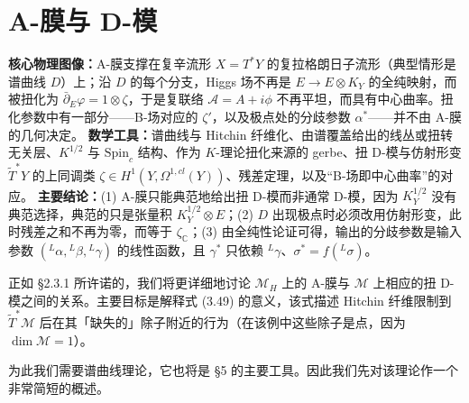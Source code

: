 

\section{A-膜与 D-模}

\begin{keytakeaway}
\textbf{核心物理图像：}A-膜支撑在复辛流形 $X=T^*Y$ 的复拉格朗日子流形（典型情形是谱曲线 $D$）上；沿 $D$ 的每个分支，Higgs 场不再是 $E\to E\otimes K_Y$ 的全纯映射，而被扭化为 $\bar\partial_E\varphi=1\otimes\zeta$，于是复联络 $\mathcal{A}=A+i\phi$ 不再平坦，而具有中心曲率。扭化参数中有一部分——B-场对应的 $\zeta'$，以及极点处的分歧参数 $\alpha^*$——并不由 A-膜的几何决定。
\textbf{数学工具：}谱曲线与 Hitchin 纤维化、由谱覆盖给出的线丛或扭转无关层、$K^{1/2}$ 与 $\mathrm{Spin}_c$ 结构、作为 $K$-理论扭化来源的 gerbe、扭 D-模与仿射形变 $\widetilde{T}^*Y$ 的上同调类 $\zeta\in H^1(Y,\Omega^{1,cl}(Y))$、残差定理，以及“B-场即中心曲率”的对应。
\textbf{主要结论：}(1) A-膜只能典范地给出扭 D-模而非通常 D-模，因为 $K_Y^{1/2}$ 没有典范选择，典范的只是张量积 $K_Y^{1/2}\otimes E$；(2) $D$ 出现极点时必须改用仿射形变，此时残差之和不再为零，而等于 $\zeta_{\mathbb{C}}$；(3) 由全纯性论证可得，输出的分歧参数是输入参数 $({}^L\alpha,{}^L\beta,{}^L\gamma)$ 的线性函数，且 $\gamma^*$ 只依赖 ${}^L\gamma$、$\sigma^*=f({}^L\sigma)$。
\end{keytakeaway}

正如 §2.3.1 所许诺的，我们将更详细地讨论 $\mathcal{M}_H$ 上的 A-膜与 $\mathcal{M}$ 上相应的扭 D-模之间的关系。主要目标是解释式 (3.49) 的意义，该式描述 Hitchin 纤维限制到 $\widetilde{T}^*\mathcal{M}$ 后在其「缺失的」除子附近的行为（在该例中这些除子是点，因为 $\dim\mathcal{M}=1$）。


为此我们需要谱曲线理论，它也将是 §5 的主要工具。因此我们先对该理论作一个非常简短的概述。

